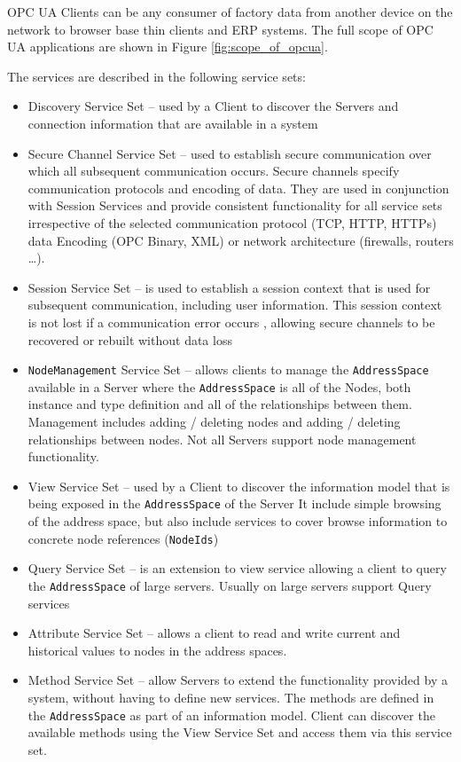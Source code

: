 OPC UA Clients can be any consumer of factory data from another device on the network to browser base thin clients and ERP systems. The full scope of OPC UA applications are shown in Figure \ref{fig:scope_of_opcua}.

The services are described in the following service sets:
\begin{itemize}
\item Discovery Service Set -- used by a Client to discover the Servers and connection information that are available in a system
\item Secure Channel Service Set -- used to establish secure communication over which all subsequent communication occurs. Secure channels specify communication protocols and encoding of data. They are used in conjunction with Session Services and provide consistent functionality for all service sets irrespective of the selected communication protocol (TCP, HTTP, HTTPs) data Encoding (OPC Binary, XML) or network architecture (firewalls, routers \ldots). 
\item Session Service Set -- is used to establish a session context that is used for subsequent communication, including user information. This session context is not lost if a communication error occurs , allowing secure channels to be recovered or rebuilt without data loss
\item \texttt{NodeManagement} Service Set -- allows clients to manage the \texttt{AddressSpace} available in a Server where the \texttt{AddressSpace} is all of the Nodes, both instance and type definition and all of the relationships between them. Management includes adding / deleting nodes and adding / deleting relationships between nodes. Not all Servers support node management functionality.
\item View Service Set – used by a Client to discover the information model that is being exposed in the \texttt{AddressSpace} of the Server It include simple browsing of the address space, but also include services to cover browse information to concrete node references (\texttt{NodeIds})
\item Query Service Set -- is an extension to view service allowing a client to query the \texttt{AddressSpace} of large servers. Usually on large servers support Query services 
\item Attribute Service Set -- allows a client to read and write current and historical values to nodes in the address spaces.
\item Method Service Set -- allow Servers to extend the functionality provided by a system, without having to define new services. The methods are defined in the \texttt{AddressSpace} as part of an information model. Client can discover the available methods using the View Service Set and access them via this service set.

\end{itemize}
